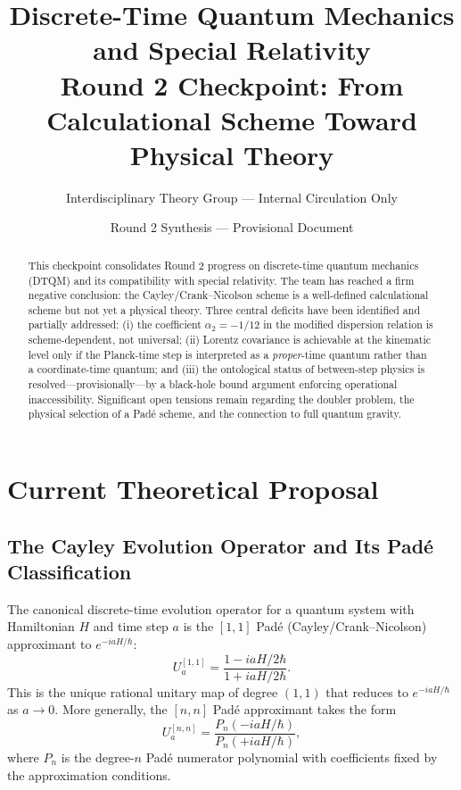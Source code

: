 \documentclass[11pt,a4paper]{article}
\title{\textbf{Discrete-Time Quantum Mechanics and Special Relativity}\\
\large Round 2 Checkpoint: From Calculational Scheme Toward Physical Theory}
\author{Interdisciplinary Theory Group --- Internal Circulation Only}
\date{Round 2 Synthesis --- Provisional Document}
\begin{document}
\maketitle

\begin{abstract}
This checkpoint consolidates Round 2 progress on discrete-time quantum mechanics (DTQM) and its compatibility with special relativity. The team has reached a firm negative conclusion: the Cayley/Crank--Nicolson scheme is a well-defined calculational scheme but not yet a physical theory. Three central deficits have been identified and partially addressed: (i) the coefficient $\alpha_2 = -1/12$ in the modified dispersion relation is scheme-dependent, not universal; (ii) Lorentz covariance is achievable at the kinematic level only if the Planck-time step is interpreted as a \emph{proper}-time quantum rather than a coordinate-time quantum; and (iii) the ontological status of between-step physics is resolved---provisionally---by a black-hole bound argument enforcing operational inaccessibility. Significant open tensions remain regarding the doubler problem, the physical selection of a Pad\'{e} scheme, and the connection to full quantum gravity.
\end{abstract}

\section{Current Theoretical Proposal}

\subsection{The Cayley Evolution Operator and Its Pad\'{e} Classification}

The canonical discrete-time evolution operator for a quantum system with Hamiltonian $H$ and time step $a$ is the $[1,1]$ Pad\'{e} (Cayley/Crank--Nicolson) approximant to $e^{-iaH/\hbar}$:
\begin{equation}
  U_a^{[1,1]} = \frac{1 - iaH/2\hbar}{1 + iaH/2\hbar}.
  \label{eq:1}
\end{equation}
This is the unique rational unitary map of degree $(1,1)$ that reduces to $e^{-iaH/\hbar}$ as $a\to 0$. More generally, the $[n,n]$ Pad\'{e} approximant takes the form
\begin{equation}
  U_a^{[n,n]} = \frac{P_n(-iaH/\hbar)}{P_n(+iaH/\hbar)},
  \label{eq:2}
\end{equation}
where $P_n$ is the degree-$n$ Pad\'{e} numerator polynomial with coefficients fixed by the approximation conditions.
\end{document}
